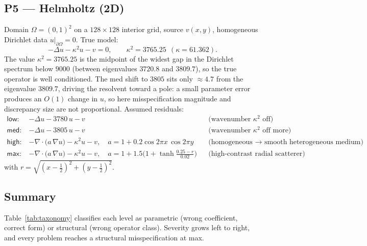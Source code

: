 \documentclass[11pt]{article}
\newcommand{\dom}{\Omega}
\newcommand{\bdry}{\partial\Omega}
\newcommand{\lap}{\Delta}
\begin{document}
\subsection*{P5 --- Helmholtz (2D)}
Domain $\dom=(0,1)^2$ on a $128\times128$ interior grid, source $v(x,y)$, homogeneous Dirichlet
data $u|_{\bdry}=0$. True model:
\begin{equation}
-\lap u - \kappa^{2} u - v = 0, \qquad \kappa^{2}=3765.25\ \ (\kappa=61.362).
\end{equation}
The value $\kappa^2=3765.25$ is the midpoint of the widest gap in the Dirichlet spectrum below
$9000$ (between eigenvalues $3720.8$ and $3809.7$), so the true operator is well conditioned. The
\textsf{med} shift to $3805$ sits only $\approx 4.7$ from the eigenvalue $3809.7$, driving the
resolvent toward a pole: a small parameter error produces an $O(1)$ change in $u$, so here
misspecification magnitude and discrepancy size are not proportional.
Assumed residuals:
\begin{align*}
\textsf{low:}\ & -\lap u - 3780\,u - v &&\text{(wavenumber $\kappa^2$ off)}\\
\textsf{med:}\ & -\lap u - 3805\,u - v &&\text{(wavenumber $\kappa^2$ off more)}\\
\textsf{high:}\ & -\nabla\!\cdot\!\big(a\,\nabla u\big) - \kappa^{2} u - v,\quad a=1+0.2\cos 2\pi x\,\cos 2\pi y
&&\text{(homogeneous $\to$ smooth heterogeneous medium)}\\
\textsf{max:}\ & -\nabla\!\cdot\!\big(a\,\nabla u\big) - \kappa^{2} u - v,\quad a=1+1.5\big(1+\tanh\tfrac{0.25-r}{0.02}\big)
&&\text{(high-contrast radial scatterer)}
\end{align*}
with $r=\sqrt{(x-\tfrac12)^2+(y-\tfrac12)^2}$.

\subsection*{Summary}
Table~\ref{tab:taxonomy} classifies each level as parametric (wrong coefficient, correct form) or
structural (wrong operator class). Severity grows left to right, and every problem reaches a
structural misspecification at \textsf{max}.
\end{document}
